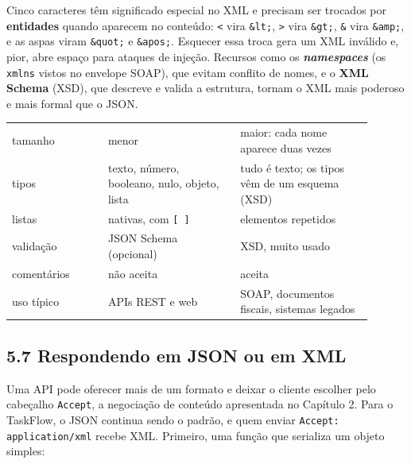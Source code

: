 Cinco caracteres têm significado especial no XML e precisam ser trocados por \textbf{entidades} quando aparecem no conteúdo: \texttt{<} vira \texttt{\&lt;}, \texttt{>} vira \texttt{\&gt;}, \texttt{\&} vira \texttt{\&amp;}, e as aspas viram \texttt{\&quot;} e \texttt{\&apos;}. Esquecer essa troca gera um XML inválido e, pior, abre espaço para ataques de injeção. Recursos como os \textbf{\textit{namespaces}} (os \texttt{xmlns} vistos no envelope SOAP), que evitam conflito de nomes, e o \textbf{XML Schema} (XSD), que descreve e valida a estrutura, tornam o XML mais poderoso e mais formal que o JSON.

\begin{center}
\begin{tabular}{@{}P{0.24\linewidth}P{0.33\linewidth}P{0.33\linewidth}@{}}
\toprule
{}
\tblheader{} &  &  \\
\midrule
tamanho & menor & maior: cada nome aparece duas vezes \\
 tipos & texto, número, booleano, nulo, objeto, lista & tudo é texto; os tipos vêm de um esquema (XSD) \\
listas & nativas, com \texttt{[ ]} & elementos repetidos \\
 validação & JSON Schema (opcional) & XSD, muito usado \\
comentários & não aceita & aceita \\
 uso típico & APIs REST e web & SOAP, documentos fiscais, sistemas legados \\
\bottomrule
\end{tabular}
\end{center}

\subsection{5.7 Respondendo em JSON ou em XML}

Uma API pode oferecer mais de um formato e deixar o cliente escolher pelo cabeçalho \texttt{Accept}, a negociação de conteúdo apresentada no Capítulo 2. Para o TaskFlow, o JSON continua sendo o padrão, e quem enviar \texttt{Accept: application/xml} recebe XML. Primeiro, uma função que serializa um objeto simples:

